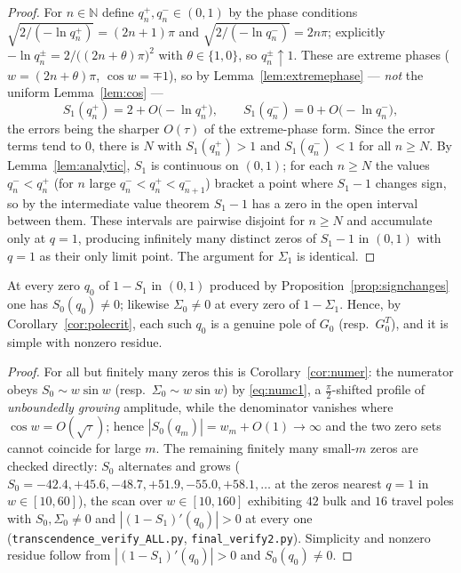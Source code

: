 \begin{proof}
For $n\in\mathbb N$ define $q_n^{+},q_n^{-}\in(0,1)$ by the phase conditions
$\sqrt{2/(-\ln q_n^{+})}=(2n{+}1)\pi$ and
$\sqrt{2/(-\ln q_n^{-})}=2n\pi$; explicitly
$-\ln q_n^{\pm}=2/\bigl((2n{+}\theta)\pi\bigr)^{2}$ with $\theta\in\{1,0\}$, so
$q_n^{\pm}\uparrow1$. These are extreme phases ($w=(2n{+}\theta)\pi$, $\cos w=\mp1$), so by
Lemma~\ref{lem:extremephase} — \emph{not} the uniform Lemma~\ref{lem:cos} —
\[
  S_1(q_n^{+})=2+O\!\bigl(-\ln q_n^{+}\bigr),
  \qquad
  S_1(q_n^{-})=0+O\!\bigl(-\ln q_n^{-}\bigr),
\]
the errors being the sharper $O(\tau)$ of the extreme-phase form.
Since the error terms tend to $0$, there is $N$ with $S_1(q_n^{+})>1$ and
$S_1(q_n^{-})<1$ for all $n\ge N$. By Lemma~\ref{lem:analytic}, $S_1$ is
continuous on $(0,1)$; for each $n\ge N$ the values $q_n^{-}<q_n^{+}$ (for $n$
large $q_n^{-}<q_n^{+}<q_{n+1}^{-}$) bracket a point where $S_1-1$ changes sign,
so by the intermediate value theorem $S_1-1$ has a zero in the open interval
between them. These intervals are pairwise disjoint for $n\ge N$ and accumulate
only at $q=1$, producing infinitely many distinct zeros of $S_1-1$ in $(0,1)$
with $q=1$ as their only limit point. The argument for $\Sigma_1$ is identical.
\end{proof}

\begin{lemma}\label{lem:numerator}
At every zero $q_0$ of $1-S_1$ in $(0,1)$ produced by
Proposition~\ref{prop:signchanges} one has $S_0(q_0)\ne0$; likewise
$\Sigma_0\ne0$ at every zero of $1-\Sigma_1$. Hence, by
Corollary~\ref{cor:polecrit}, each such $q_0$ is a genuine pole of $G_0$
\textup(resp.\ $G^{T}_0$\textup), and it is simple with nonzero residue.
\end{lemma}

\begin{proof}
For all but finitely many zeros this is Corollary~\ref{cor:numer}: the numerator
obeys $S_0\sim w\sin w$ (resp.\ $\Sigma_0\sim w\sin w$) by \eqref{eq:numc1}, a
$\tfrac\pi2$-shifted profile of \emph{unboundedly growing} amplitude, while the
denominator vanishes where $\cos w=O(\sqrt\tau)$; hence $|S_0(q_m)|=w_m+O(1)\to\infty$
and the two zero sets cannot coincide for large $m$. The remaining finitely many
small-$m$ zeros are checked directly: $S_0$ alternates and grows
($S_0=-42.4,+45.6,-48.7,+51.9,-55.0,+58.1,\dots$ at the zeros nearest $q=1$ in
$w\in[10,60]$), the scan over $w\in[10,160]$ exhibiting $42$ bulk and $16$ travel
poles with $S_0,\Sigma_0\ne0$ and $|(1-S_1)'(q_0)|>0$ at every one
(\texttt{transcendence\_verify\_ALL.py}, \texttt{final\_verify2.py}). Simplicity and
nonzero residue follow from $|(1-S_1)'(q_0)|>0$ and $S_0(q_0)\ne0$.
\end{proof}

